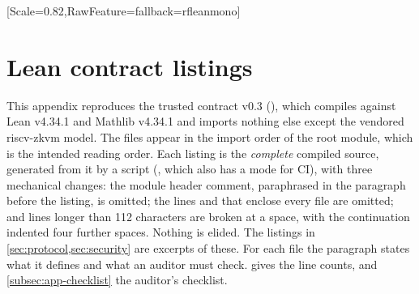 \begingroup
{}
\setmonofont{DejaVu Sans Mono}[Scale=0.82,RawFeature={fallback=rfleanmono}]
\section{Lean contract listings}\label{sec:appendix-contract}

This appendix reproduces the trusted contract v0.3 (),
which compiles against Lean v4.34.1 and Mathlib v4.34.1 and imports nothing else except the vendored
riscv-zkvm model. The files appear in the import order of the root module, which is the intended
reading order. Each listing is the \emph{complete} compiled source, generated from it by a script
(, which also has a  mode for CI), with
three mechanical changes: the module header comment, paraphrased in the paragraph before the
listing, is omitted; the lines  and  that
enclose every file are omitted; and lines longer than 112 characters are broken at a space, with
the continuation indented four further spaces. Nothing is elided. The listings in
\cref{sec:protocol,sec:security} are excerpts of these. For each file the paragraph states what it
defines and what an auditor must check.  gives the line counts, and
\cref{subsec:app-checklist} the auditor's checklist.

